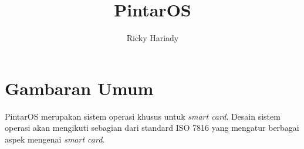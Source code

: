 \documentclass[a4paper, 12pt]{report}
\begin{document}
\title{PintarOS}
\author{Ricky Hariady}

\maketitle

\chapter{Gambaran Umum}
\label{overview}





PintarOS merupakan sistem operasi khusus untuk \emph{smart card}. Desain sistem operasi akan mengikuti sebagian dari standard ISO 7816 yang mengatur berbagai aspek mengenai \emph{smart card}.
\end{document}
